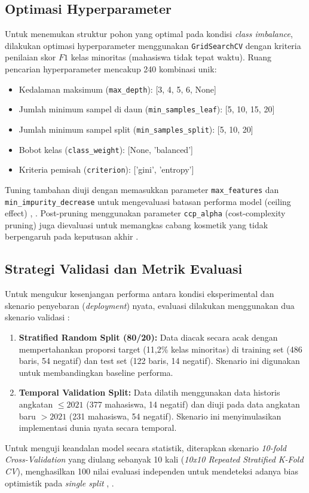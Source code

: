 \documentclass{ieeeaccess}
\begin{document}
\subsection{Optimasi Hyperparameter}
Untuk menemukan struktur pohon yang optimal pada kondisi \emph{class imbalance}, dilakukan optimasi hyperparameter menggunakan \texttt{GridSearchCV} dengan kriteria penilaian skor $F1$ kelas minoritas (mahasiswa tidak tepat waktu). Ruang pencarian hyperparameter mencakup 240 kombinasi unik:
\begin{itemize}
    \item Kedalaman maksimum (\texttt{max\_depth}): [3, 4, 5, 6, None]
    \item Jumlah minimum sampel di daun (\texttt{min\_samples\_leaf}): [5, 10, 15, 20]
    \item Jumlah minimum sampel split (\texttt{min\_samples\_split}): [5, 10, 20]
    \item Bobot kelas (\texttt{class\_weight}): [None, 'balanced']
    \item Kriteria pemisah (\texttt{criterion}): ['gini', 'entropy']
\end{itemize}
Tuning tambahan diuji dengan memasukkan parameter \texttt{max\_features} dan \texttt{min\_impurity\_decrease} untuk mengevaluasi batasan performa model (ceiling effect) \cite{ref15}, \cite{ref16}. Post-pruning menggunakan parameter \texttt{ccp\_alpha} (cost-complexity pruning) juga dievaluasi untuk memangkas cabang kosmetik yang tidak berpengaruh pada keputusan akhir \cite{ref17}.

\subsection{Strategi Validasi dan Metrik Evaluasi}
Untuk mengukur kesenjangan performa antara kondisi eksperimental dan skenario penyebaran (\emph{deployment}) nyata, evaluasi dilakukan menggunakan dua skenario validasi \cite{ref29}:
\begin{enumerate}
    \item \textbf{Stratified Random Split (80/20):} Data diacak secara acak dengan mempertahankan proporsi target (11,2\% kelas minoritas) di training set (486 baris, 54 negatif) dan test set (122 baris, 14 negatif). Skenario ini digunakan untuk membandingkan baseline performa.
    \item \textbf{Temporal Validation Split:} Data dilatih menggunakan data historis angkatan $\le 2021$ (377 mahasiswa, 14 negatif) dan diuji pada data angkatan baru $>2021$ (231 mahasiswa, 54 negatif). Skenario ini menyimulasikan implementasi dunia nyata secara temporal.
\end{enumerate}
Untuk menguji keandalan model secara statistik, diterapkan skenario \emph{10-fold Cross-Validation} yang diulang sebanyak 10 kali (\emph{10x10 Repeated Stratified K-Fold CV}), menghasilkan 100 nilai evaluasi independen untuk mendeteksi adanya bias optimistik pada \emph{single split} \cite{ref28}, \cite{ref30}. 
\end{document}
